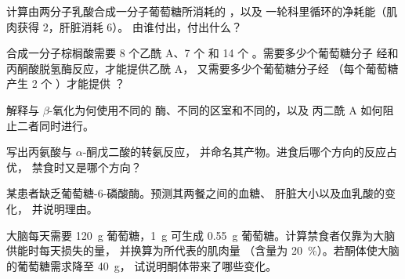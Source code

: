 \begin{exercise}[$\star\star$]\label{exo:b1:biosyntheses-integration:5}
计算由两分子乳酸合成一分子葡萄糖所消耗的 ，以及
一轮科里循环的净耗能（肌肉获得 2，肝脏消耗 6）。
由谁付出，付出什么？
\end{exercise}

\begin{exercise}[$\star\star$]\label{exo:b1:biosyntheses-integration:6}
合成一分子棕榈酸需要 8 个乙酰 A、7 个  和 14 个 。需要多少个葡萄糖分子
经和丙酮酸脱氢酶反应，才能提供乙酰 A，
又需要多少个葡萄糖分子经
（每个葡萄糖产生 2 个 ）才能提供 ？
\end{exercise}

\begin{exercise}[$\star\star$]\label{exo:b1:biosyntheses-integration:7}
解释与 $\beta$-氧化为何使用不同的
酶、不同的区室和不同的，以及
丙二酰 A 如何阻止二者同时进行。
\end{exercise}

\begin{exercise}[$\star\star$]\label{exo:b1:biosyntheses-integration:8}
写出丙氨酸与 $\alpha$-酮戊二酸的转氨反应，
并命名其产物。进食后哪个方向的反应占优，
禁食时又是哪个方向？
\end{exercise}

\begin{exercise}[$\star\star$]\label{exo:b1:biosyntheses-integration:9}
某患者缺乏葡萄糖-6-磷酸酶。预测其两餐之间的血糖、
肝脏大小以及血乳酸的变化，
并说明理由。
\end{exercise}

\begin{exercise}[$\star\star\star$]\label{exo:b1:biosyntheses-integration:10}
大脑每天需要 \qty{120}{g} 葡萄糖，\qty{1}{g} 
可生成 \qty{0.55}{g} 葡萄糖。计算禁食者仅靠为大脑供能时每天损失的量，
并换算为所代表的肌肉量
（含量为 \qty{20}{\%}）。若酮体使大脑的葡萄糖需求降至 \qty{40}{g}，
试说明酮体带来了哪些变化。
\end{exercise}

